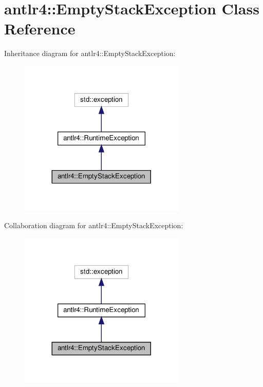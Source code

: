 \hypertarget{classantlr4_1_1EmptyStackException}{}\section{antlr4\+:\+:Empty\+Stack\+Exception Class Reference}
\label{classantlr4_1_1EmptyStackException}


Inheritance diagram for antlr4\+:\+:Empty\+Stack\+Exception\+:
\nopagebreak
\begin{figure}[H]
\begin{center}
\leavevmode
\includegraphics[width=224pt]{classantlr4_1_1EmptyStackException__inherit__graph}
\end{center}
\end{figure}


Collaboration diagram for antlr4\+:\+:Empty\+Stack\+Exception\+:
\nopagebreak
\begin{figure}[H]
\begin{center}
\leavevmode
\includegraphics[width=224pt]{classantlr4_1_1EmptyStackException__coll__graph}
\end{center}
\end{figure}
